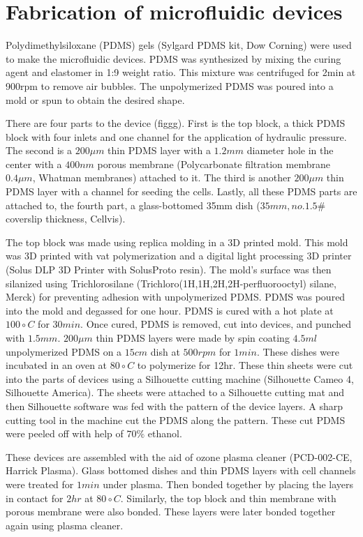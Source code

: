 \section{Fabrication of microfluidic devices}
 
Polydimethylsiloxane (PDMS) gels (Sylgard PDMS kit, Dow Corning) were used to make the microfluidic devices. PDMS was synthesized by mixing the curing agent and elastomer in 1:9 weight ratio. This mixture was centrifuged for 2min at 900rpm to remove air bubbles. The unpolymerized PDMS was poured into a mold or spun to obtain the desired shape. 

There are four parts to the device (figgg). First is the top block, a thick PDMS block with four inlets and one channel for the application of hydraulic pressure. The second is a $200 \mu m$ thin PDMS layer with a $1.2mm$ diameter hole in the center with a $400nm$ porous membrane (Polycarbonate filtration membrane $0.4\mu m$, Whatman membranes) attached to it. The third is another $200 \mu m$ thin PDMS layer with a channel for seeding the cells. Lastly, all these PDMS parts are attached to, the fourth part, a glass-bottomed 35mm dish ($35mm, no. 1.5\#$ coverslip thickness, Cellvis). 

The top block was made using replica molding in a 3D printed mold. This mold was 3D printed with vat polymerization and a digital light processing 3D printer (Solus DLP 3D Printer with SolusProto resin). The mold’s surface was then silanized using Trichlorosilane (Trichloro(1H,1H,2H,2H-perfluorooctyl) silane, Merck) for preventing adhesion with unpolymerized PDMS. PDMS was poured into the mold and degassed for one hour. PDMS is cured with a hot plate at $100\circ C$ for $30min$. Once cured, PDMS is removed, cut into devices, and punched with $1.5mm$. $200\mu m$ thin PDMS layers were made by spin coating $4.5ml$ unpolymerized PDMS on a $15cm$ dish at $500rpm$ for $1min$. These dishes were incubated in an oven at $80\circ C$ to polymerize for 12hr. These thin sheets were cut into the parts of devices using a Silhouette cutting machine (Silhouette Cameo 4, Silhouette America). The sheets were attached to a Silhouette cutting mat and then Silhouette software was fed with the pattern of the device layers. A sharp cutting tool in the machine cut the PDMS along the pattern. These cut PDMS were peeled off with help of $70\%$ ethanol. 

These devices are assembled with the aid of ozone plasma cleaner (PCD-002-CE, Harrick Plasma). Glass bottomed dishes and thin PDMS layers with cell channels were treated for $1 min$ under plasma. Then bonded together by placing the layers in contact for $2 hr$ at $80 \circ C$. Similarly, the top block and thin membrane with porous membrane were also bonded. These layers were later bonded together again using plasma cleaner.

